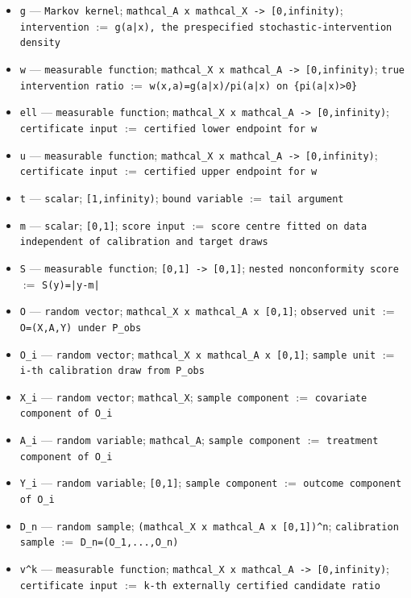 \documentclass{article}
\begin{document}
\begin{itemize}
  \item \texttt{g} --- \texttt{Markov kernel}; \texttt{mathcal\_A x mathcal\_X -> [0,infinity)}; \texttt{intervention} $:=$ \texttt{g(a|x), the prespecified stochastic-intervention density}
  \item \texttt{w} --- \texttt{measurable function}; \texttt{mathcal\_X x mathcal\_A -> [0,infinity)}; \texttt{true intervention ratio} $:=$ \texttt{w(x,a)=g(a|x)/pi(a|x) on \{pi(a|x)>0\}}
  \item \texttt{ell} --- \texttt{measurable function}; \texttt{mathcal\_X x mathcal\_A -> [0,infinity)}; \texttt{certificate input} $:=$ \texttt{certified lower endpoint for w}
  \item \texttt{u} --- \texttt{measurable function}; \texttt{mathcal\_X x mathcal\_A -> [0,infinity)}; \texttt{certificate input} $:=$ \texttt{certified upper endpoint for w}
  \item \texttt{t} --- \texttt{scalar}; \texttt{[1,infinity)}; \texttt{bound variable} $:=$ \texttt{tail argument}
  \item \texttt{m} --- \texttt{scalar}; \texttt{[0,1]}; \texttt{score input} $:=$ \texttt{score centre fitted on data independent of calibration and target draws}
  \item \texttt{S} --- \texttt{measurable function}; \texttt{[0,1] -> [0,1]}; \texttt{nested nonconformity score} $:=$ \texttt{S(y)=|y-m|}
  \item \texttt{O} --- \texttt{random vector}; \texttt{mathcal\_X x mathcal\_A x [0,1]}; \texttt{observed unit} $:=$ \texttt{O=(X,A,Y) under P\_obs}
  \item \texttt{O\_i} --- \texttt{random vector}; \texttt{mathcal\_X x mathcal\_A x [0,1]}; \texttt{sample unit} $:=$ \texttt{i-th calibration draw from P\_obs}
  \item \texttt{X\_i} --- \texttt{random vector}; \texttt{mathcal\_X}; \texttt{sample component} $:=$ \texttt{covariate component of O\_i}
  \item \texttt{A\_i} --- \texttt{random variable}; \texttt{mathcal\_A}; \texttt{sample component} $:=$ \texttt{treatment component of O\_i}
  \item \texttt{Y\_i} --- \texttt{random variable}; \texttt{[0,1]}; \texttt{sample component} $:=$ \texttt{outcome component of O\_i}
  \item \texttt{D\_n} --- \texttt{random sample}; \texttt{(mathcal\_X x mathcal\_A x [0,1])\textasciicircum{}n}; \texttt{calibration sample} $:=$ \texttt{D\_n=(O\_1,...,O\_n)}
  \item \texttt{v\textasciicircum{}k} --- \texttt{measurable function}; \texttt{mathcal\_X x mathcal\_A -> [0,infinity)}; \texttt{certificate input} $:=$ \texttt{k-th externally certified candidate ratio}

\end{itemize}
\end{document}
